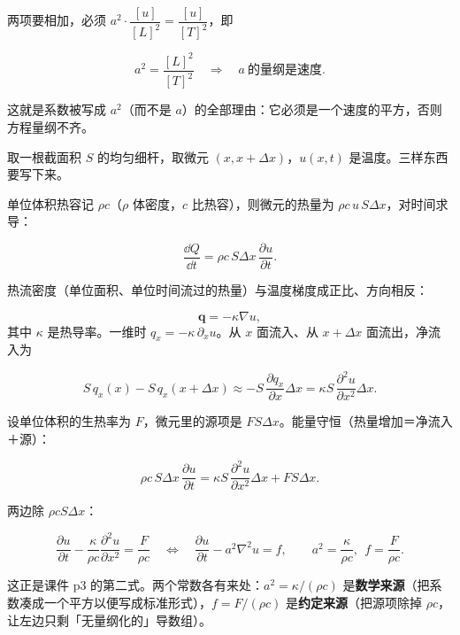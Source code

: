 \documentclass[11pt]{ctexart}
\let\origsubhdr\subhdr
\renewcommand{\subhdr}[1]{\par\needspace{3\baselineskip}\origsubhdr{#1}}
\begin{document}
两项要相加，必须 $a^2\cdot\dfrac{[u]}{[L]^2}=\dfrac{[u]}{[T]^2}$，即

\[
a^2=\frac{[L]^2}{[T]^2}\quad\Longrightarrow\quad a\ \text{的量纲是速度}.
\]

这就是系数被写成 $a^2$（而不是 $a$）的全部理由：它必须是一个速度的平方，否则方程量纲不齐。


取一根截面积 $S$ 的均匀细杆，取微元 $(x,x+\Delta x)$，$u(x,t)$ 是温度。三样东西要写下来。

单位体积热容记 $\rho c$（$\rho$ 体密度，$c$ 比热容），则微元的热量为 $\rho c\,u\,S\Delta x$，对时间求导：

\[
\frac{\dd Q}{\dd t}=\rho c\,S\Delta x\,\frac{\partial u}{\partial t}.
\]

热流密度（单位面积、单位时间流过的热量）与温度梯度成正比、方向相反：

\[
\mathbf q=-\kappa\nabla u ,
\]
其中 $\kappa$ 是热导率。一维时 $q_x=-\kappa\,\partial_x u$。从 $x$ 面流入、从 $x+\Delta x$ 面流出，净流入为

\[
S\,q_x(x)-S\,q_x(x+\Delta x)\approx -S\,\frac{\partial q_x}{\partial x}\Delta x
=\kappa S\,\frac{\partial^2u}{\partial x^2}\Delta x .
\]

设单位体积的生热率为 $F$，微元里的源项是 $F S\Delta x$。能量守恒（热量增加＝净流入＋源）：

\[
\rho c\,S\Delta x\,\frac{\partial u}{\partial t}
=\kappa S\,\frac{\partial^2u}{\partial x^2}\Delta x+F S\Delta x .
\]

两边除 $\rho c S\Delta x$：

\[
\frac{\partial u}{\partial t}-\frac{\kappa}{\rho c}\frac{\partial^2u}{\partial x^2}
=\frac{F}{\rho c}
\quad\Longleftrightarrow\quad
\frac{\partial u}{\partial t}-a^2\nabla^2u=f,
\qquad a^2=\frac{\kappa}{\rho c},\ \ f=\frac{F}{\rho c}.
\]

这正是课件 p3 的第二式。两个常数各有来处：$a^2=\kappa/(\rho c)$ 是\textbf{数学来源}（把系数凑成一个平方以便写成标准形式），$f=F/(\rho c)$ 是\textbf{约定来源}（把源项除掉 $\rho c$，让左边只剩「无量纲化的」导数组）。


\end{document}
